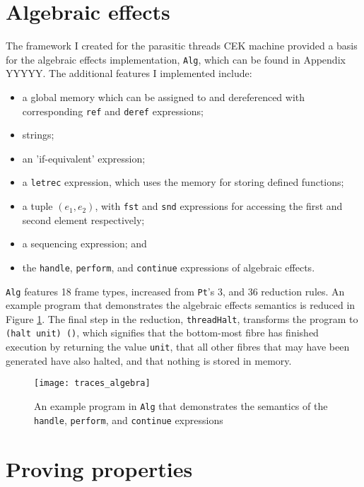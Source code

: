 \documentclass[12pt,a4paper,twoside,openright]{report}
\begin{document}
\section{Algebraic effects}\label{impllast}

The framework I created for the parasitic threads CEK machine provided a basis for the algebraic effects implementation, \texttt{Alg}, which can be found in Appendix YYYYY. The additional features I implemented include:

\begin{itemize}
\item a global memory which can be assigned to and dereferenced with corresponding \texttt{ref} and \texttt{deref} expressions;
\item strings;
\item an 'if-equivalent' expression;
\item a \texttt{letrec} expression, which uses the memory for storing defined functions;
\item a tuple $(e_1, e_2)$, with \texttt{fst} and \texttt{snd} expressions for accessing the first and second element respectively;
\item a sequencing expression; and
\item the \texttt{handle}, \texttt{perform}, and \texttt{continue} expressions of algebraic effects.
\end{itemize}

\texttt{Alg} features 18 frame types, increased from \texttt{Pt}'s 3, and 36 reduction rules. An example program that demonstrates the algebraic effects semantics is reduced in Figure \ref{fig:traces_algebra}. The final step in the reduction, \texttt{threadHalt}, transforms the program to \texttt{(halt unit) ()}, which signifies that the bottom-most fibre has finished execution by returning the value \texttt{unit}, that all other fibres that may have been generated have also halted, and that nothing is stored in memory.

\begin{figure}
\centering
\caption{An example program in \texttt{Alg} that demonstrates the semantics of the \texttt{handle}, \texttt{perform}, and \texttt{continue} expressions}
\label{fig:traces_algebra}
\texttt{[image: traces\_algebra]}
\end{figure}

\section{Proving properties}\label{implproving}
\end{document}

